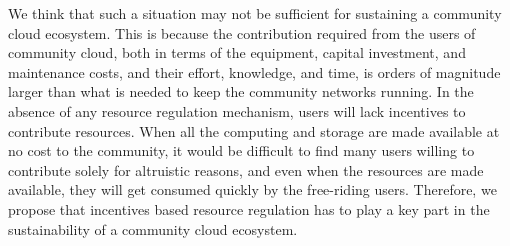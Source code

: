We think that such a situation may not be sufficient for sustaining a community cloud ecosystem.
This is because the contribution required from the users of community cloud, both in terms of the equipment, 
capital investment, and maintenance costs, and their effort, knowledge, and time,
is orders of magnitude larger than what is needed to keep the community networks running.
In the absence of any resource regulation mechanism, users will lack incentives to contribute resources.
When all the computing and storage are made available at no cost to the community, 
it would be difficult to find many users willing to contribute solely for altruistic reasons,
and even when the resources are made available,
they will get consumed quickly by the free-riding users.
Therefore, we propose that incentives based resource regulation has to play a key part
in the sustainability of a community cloud ecosystem.

